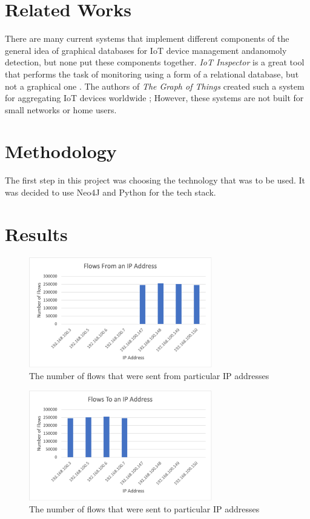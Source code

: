\documentclass[conference]{IEEEtran}
\begin{document}
\section{Related Works}
There are many current systems that implement different components of the general idea of graphical databases for
IoT device management andanomoly detection, but none put these components together. \textit{IoT Inspector} is a great
tool that performs the task of monitoring using a form of a relational database, but not a graphical one \cite{IoTInspector}.
The authors of \textit{The Graph of Things} created such a system for aggregating IoT devices worldwide \cite{GraphofThings}; 
However, these systems are not built for small networks or home users.

\section{Methodology}
The first step in this project was choosing the technology that was to be used. It was decided to use Neo4J
and Python for the tech stack. 

\section{Results}

\begin{figure}[h]
    \includegraphics[width=8cm]{Figure1.png}
    \centering
    \caption{The number of flows that were sent from particular IP addresses}
    \label{fig:flowfrom}
\end{figure}

\begin{figure}[h]
    \includegraphics[width=8cm]{Figure2.png}
    \centering
    \caption{The number of flows that were sent to particular IP addresses}
    \label{fig:flowto}
\end{figure}
\end{document}

